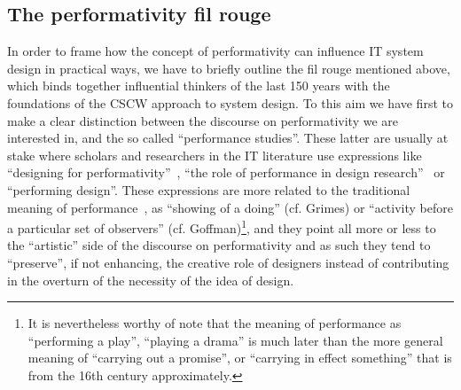\documentclass{article}
\begin{document}
\subsection{The performativity fil rouge}

In order to frame how the concept of performativity can influence IT system design in practical ways, we have to briefly outline the fil rouge mentioned above, which binds together influential thinkers of the last 150 years with the foundations of the CSCW approach to system design. To this aim we have first to make a clear distinction between the discourse on performativity we are interested in, and the so called ``performance studies''. These latter are usually at stake where scholars and researchers in the IT literature use expressions like ``designing for performativity''~\citep{wagner_whisperings_2010}, ``the role of performance in design
research''~\citep{jacucci_manifesto_2005} or ``performing design''. These expressions are more related to the traditional meaning of performance~\citep{dirksmeier_time_2008}, as ``showing of a doing'' (cf. Grimes) or ``activity before a particular set of observers'' (cf. Goffman)\footnote{It is nevertheless worthy of note that the meaning of performance as ``performing a play'', ``playing a drama'' is much later than the more general meaning of ``carrying out a promise'', or ``carrying in effect something'' that is from the 16th century approximately.}, and they point all more or less to the ``artistic'' side of the discourse on performativity and as such they tend to ``preserve'', if not enhancing, the creative role of designers instead of contributing in the overturn of the necessity of the idea of design.
\end{document}
